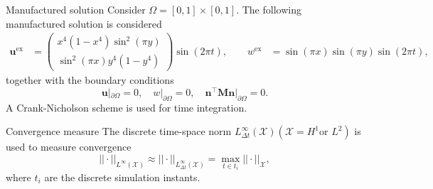 \documentclass[aspectratio=169]{beamer}
\begin{document}
\begin{frame}{Manufactured solution}
	Consider $\Omega= [0,1] \times [0, 1]$. The following manufactured solution is considered
	\begin{equation*}
		\begin{aligned}
			\bm{u}^{\text{ex}} &= \begin{pmatrix}
				x^4 (1-x^4)\sin^2(\pi y) \\
				\sin^2(\pi x) y^4 (1-y^4)
			\end{pmatrix} \sin(2\pi t), \qquad
			w^{\text{ex}} &= \sin(\pi x)\sin(\pi y)\sin(2 \pi t), 
		\end{aligned}
	\end{equation*}
	together with the boundary conditions
	\begin{equation*}
		\bm{u}|_{\partial\Omega} = 0, \quad w|_{\partial\Omega}=0, \quad \bm{n}^\top\bm{M}\bm{n}|_{\partial\Omega}=0.
	\end{equation*}
A Crank-Nicholson scheme is used for time integration.
\begin{block}{Convergence measure}
	The discrete time-space norm $L^\infty_{\Delta t} (\mathcal{X}) (\mathcal{X} = H^1 \text{or } L^2)$ is used to measure convergence
	\[
	||\cdot ||_{L^\infty (\mathcal{X})} \approx || \cdot ||_{L^\infty_{\Delta t} (\mathcal{X})} = \max_{t \in t_i} ||\cdot||_{\mathcal{X}},
	\]
	where $t_i$ are the discrete simulation instants.
\end{block}

\end{frame}
\end{document}
